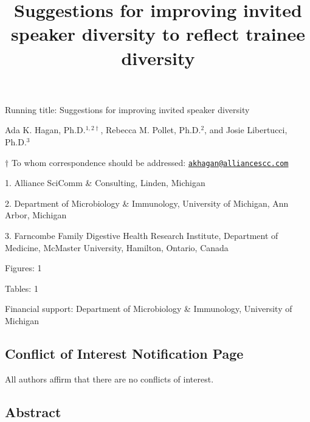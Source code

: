 \documentclass[10pt,]{article}
\title{\textbf{Suggestions for improving invited speaker diversity to reflect
trainee diversity}}
\author{}
\date{}
\begin{document}
\maketitle

\vspace{30mm}

Running title: Suggestions for improving invited speaker diversity

\vspace{35mm}

Ada K. Hagan, Ph.D.\(^{1,2\dagger}\), Rebecca M. Pollet, Ph.D.\({^2}\),
and Josie Libertucci, Ph.D.\({^3}\)

\vspace{35mm}

\(\dagger\) To whom correspondence should be addressed:
\href{mailto:akhagan@alliancescc.com}{\nolinkurl{akhagan@alliancescc.com}}

1. Alliance SciComm \& Consulting, Linden, Michigan

2. Department of Microbiology \& Immunology, University of Michigan, Ann
Arbor, Michigan

3. Farncombe Family Digestive Health Research Institute, Department of
Medicine, McMaster University, Hamilton, Ontario, Canada

Figures: 1

Tables: 1

Financial support: Department of Microbiology \& Immunology, University
of Michigan

\newpage

\subsection{Conflict of Interest Notification
Page}\label{conflict-of-interest-notification-page}

\vspace{40mm}

All authors affirm that there are no conflicts of interest.

\newpage

\linenumbers

\subsection{Abstract}\label{abstract}
\end{document}
